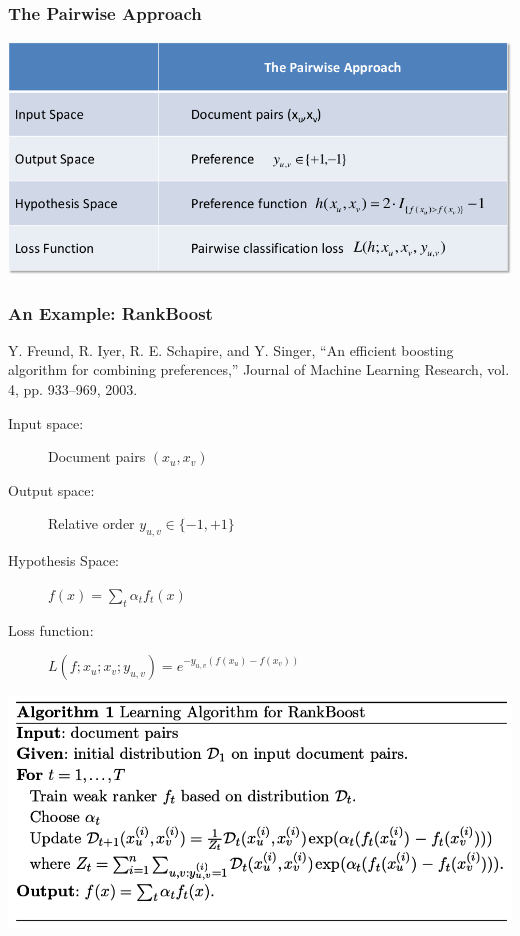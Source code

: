 \documentclass{beamer}
\begin{document}
\begin{frame}
    \frametitle{The Pairwise Approach}
    \centering
    \includegraphics[width=\linewidth]{pairwise}
\end{frame}

\begin{frame}
    \frametitle{An Example: RankBoost}
    \begin{minipage}{1.0\linewidth}
        \footnotesize Y. Freund, R. Iyer, R. E. Schapire, and Y. Singer, ``An
        efficient boosting algorithm for combining preferences,'' Journal of
        Machine Learning Research, vol. 4, pp. 933--969, 2003.
    \end{minipage}
    \vfill
    \begin{description}
    \item[Input space:] Document pairs $(x_u,x_v)$
    \item[Output space:] Relative order $y_{u,v} \in \{-1,+1\}$
    \item[Hypothesis Space:] $f(x) = \sum_t\alpha_tf_t(x)$ 
    \item[Loss function:] $L(f; x_u; x_v; y_{u,v}) = e^{-y_{u,v}(f(x_u)-f(x_v))}$
    \end{description}
    \vfill
    \centering
    \includegraphics[width=\linewidth]{rankboost}

\end{frame}
\end{document}
